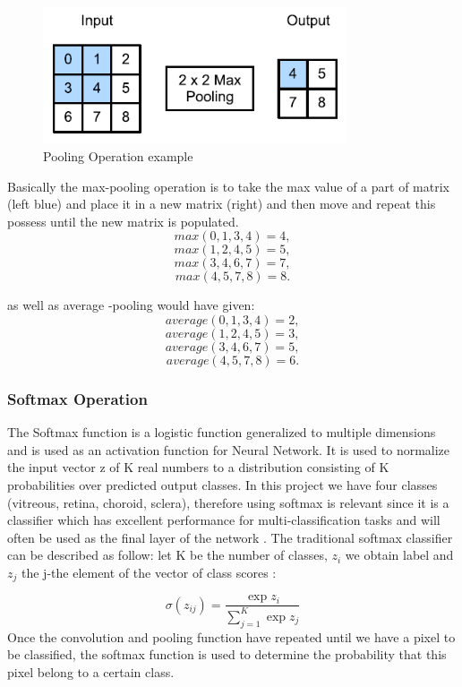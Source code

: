 \documentclass[12pt,a4paper]{scrartcl}
\begin{document}
\begin{figure}[H]
    \centering
    \includegraphics[width=0.8\textwidth]{./images/pooling_example.png}
    \caption{Pooling Operation example  \cite{DIDLBook}}
\end{figure}
Basically the max-pooling operation is to take the max value of a part of matrix (left blue) and place it in a new matrix (right) and then move and repeat this possess until the new matrix is populated.
\[max(0, 1, 3, 4) = 4,\]
\[max(1, 2, 4, 5) = 5,\]
\[max(3, 4, 6, 7) = 7,\]
\[max(4, 5, 7, 8) = 8.\]


as well as average -pooling would have given:
\[average (0, 1, 3, 4) = 2,\]
\[average (1, 2, 4, 5) = 3,\]
\[average (3, 4, 6, 7) = 5,\]
\[average (4, 5, 7, 8) = 6.\]

\subsubsection{Softmax Operation}
The Softmax function is a logistic function generalized to multiple dimensions and is used as an activation function for Neural Network. It is used to normalize the input vector z of K real numbers to a distribution consisting of K probabilities over predicted output classes. In this project we have four classes (vitreous, retina, choroid, sclera), therefore using softmax is relevant since it is a classifier which has excellent performance for multi-classification tasks and will often be used as the final layer of the network \cite{SoftMaxClassification}. 
The traditional softmax classifier can be described as follow: let  K be the number of classes, \(z_i\) we obtain  label and \(z_j\) the j-the element of the vector of class scores \cite{SoftMaxClassification, DIDLBook} :

\begin{equation}
\sigma(z_{ij}) = \frac{\exp{z_i}}{\sum_{j=1}^{K} \exp{z_j}}
\end{equation}
Once the convolution and pooling function have repeated until we have a pixel to be classified, the softmax function is used to determine the probability that this pixel belong to a certain class.
\end{document}
